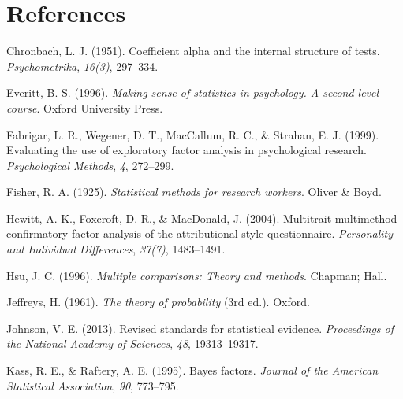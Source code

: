 \documentclass[
  a4paper,
]{book}
\newlength{\cslhangindent}
\newlength{\cslentryspacingunit} %
\newenvironment{CSLReferences}[2] %
 {%
  \setlength{\parindent}{0pt}
  \ifodd #1
  \let\oldpar\par
  \def\par{\hangindent=\cslhangindent\oldpar}
  \fi
  \setlength{\parskip}{#2\cslentryspacingunit}
 }%
 {}
\begin{document}

\hypertarget{references}{%
\chapter*{References}\label{references}}


\hypertarget{refs}{}
\begin{CSLReferences}{1}{0}
\leavevmode{}%
Chronbach, L. J. (1951). Coefficient alpha and the internal structure of
tests. \emph{Psychometrika}, \emph{16(3)}, 297--334.

\leavevmode{}%
Everitt, B. S. (1996). \emph{Making sense of statistics in psychology. A
second-level course}. Oxford University Press.

\leavevmode{}%
Fabrigar, L. R., Wegener, D. T., MacCallum, R. C., \& Strahan, E. J.
(1999). Evaluating the use of exploratory factor analysis in
psychological research. \emph{Psychological Methods}, \emph{4},
272--299.

\leavevmode{}%
Fisher, R. A. (1925). \emph{Statistical methods for research workers}.
Oliver \& Boyd.

\leavevmode{}%
Hewitt, A. K., Foxcroft, D. R., \& MacDonald, J. (2004).
Multitrait-multimethod confirmatory factor analysis of the attributional
style questionnaire. \emph{Personality and Individual Differences},
\emph{37(7)}, 1483--1491.

\leavevmode{}%
Hsu, J. C. (1996). \emph{Multiple comparisons: Theory and methods}.
Chapman; Hall.

\leavevmode{}%
Jeffreys, H. (1961). \emph{The theory of probability} (3rd ed.). Oxford.

\leavevmode{}%
Johnson, V. E. (2013). Revised standards for statistical evidence.
\emph{Proceedings of the National Academy of Sciences}, \emph{48},
19313--19317.

\leavevmode{}%
Kass, R. E., \& Raftery, A. E. (1995). Bayes factors. \emph{Journal of
the American Statistical Association}, \emph{90}, 773--795.


\end{CSLReferences}
\end{document}
